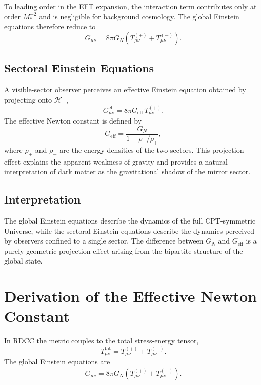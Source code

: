 \documentclass[11pt,a4paper]{article}
\begin{document}
To leading order in the EFT expansion, the interaction term contributes only at order $M_*^{-2}$ and is negligible for background cosmology. The global Einstein equations therefore reduce to
\begin{equation}
G_{\mu\nu} = 8\pi G_N \left( T_{\mu\nu}^{(+)} + T_{\mu\nu}^{(-)} \right).
\end{equation}

\subsection{Sectoral Einstein Equations}

A visible-sector observer perceives an effective Einstein equation obtained by projecting onto $\mathcal{H}_+$,
\begin{equation}
G_{\mu\nu}^{\mathrm{eff}} = 8\pi G_{\mathrm{eff}} \, T_{\mu\nu}^{(+)}.
\end{equation}
The effective Newton constant is defined by
\begin{equation}
G_{\mathrm{eff}} = \frac{G_N}{1 + \rho_-/\rho_+},
\end{equation}
where $\rho_+$ and $\rho_-$ are the energy densities of the two sectors. This projection effect explains the apparent weakness of gravity and provides a natural interpretation of dark matter as the gravitational shadow of the mirror sector.

\subsection{Interpretation}

The global Einstein equations describe the dynamics of the full CPT-symmetric Universe, while the sectoral Einstein equations describe the dynamics perceived by observers confined to a single sector. The difference between $G_N$ and $G_{\mathrm{eff}}$ is a purely geometric projection effect arising from the bipartite structure of the global state.
\section{Derivation of the Effective Newton Constant}

In RDCC the metric couples to the total stress-energy tensor,
\begin{equation}
T_{\mu\nu}^{\mathrm{tot}} = T_{\mu\nu}^{(+)} + T_{\mu\nu}^{(-)}.
\end{equation}
The global Einstein equations are
\begin{equation}
G_{\mu\nu} = 8\pi G_N \left( T_{\mu\nu}^{(+)} + T_{\mu\nu}^{(-)} \right).
\label{eq:globalEinstein}
\end{equation}
\end{document}
